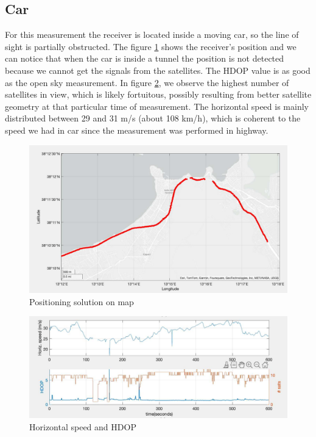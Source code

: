 \subsection{Car}
\label{sec:car}
For this measurement the receiver is located inside a moving car, so the line of sight is partially obstructed. The figure \ref{fig:car_figure_6} shows the receiver's position and we can notice that when the car is inside a tunnel the position is not detected because we cannot get the signals from the satellites. The HDOP value is as good as the open sky measurement. In figure \ref{fig:car_figure_4}, we observe the highest number of satellites in view, which is likely fortuitous, possibly resulting from better satellite geometry at that particular time of measurement. The horizontal speed is mainly distributed between 29 and 31 m/s (about 108 km/h), which is coherent to the speed we had in car since the measurement was performed in highway.
\begin{figure}[H]
\includegraphics[scale=0.15]{images/car_figure_6.pdf}
\caption{Positioning solution on map}
\label{fig:car_figure_6}
\end{figure}
\begin{figure}[H]
\includegraphics[scale=0.2]{images/car_figure_4.pdf}
\caption{Horizontal speed and HDOP}
\label{fig:car_figure_4}
\end{figure}


